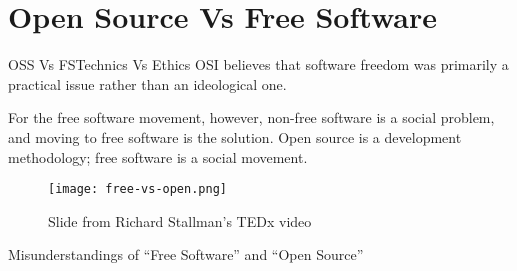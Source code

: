 \documentclass{beamer}
\begin{document}
    \section{Open Source Vs Free Software}
    \begin{frame}{OSS Vs FS}{Technics Vs Ethics}
        OSI believes that software freedom was primarily a practical issue rather than an ideological one.\cite{OSIWEBSITE:5}

        For the free software movement, however, non-free software is a social problem, and moving to free software is the solution.\cite{stallman2009viewpoint}
        Open source is a development methodology; free software is a social movement.\cite{stallman2009viewpoint}
        \begin{figure}
            \centering
            \texttt{[image: free-vs-open.png]}
            \caption{Slide from Richard Stallman's TEDx video\cite{rmstedx}}
        \end{figure}
        Misunderstandings of “Free Software” and “Open Source”
    \end{frame}
\end{document}
